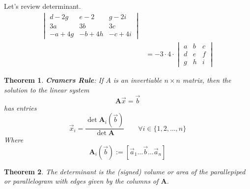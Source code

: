 \documentclass[11pt]{article}
\newtheorem{thm}{Theorem}
\begin{document}
Let's review determinant.
\begin{align*}
  \begin{vmatrix} d-2g & e-2 & g-2i \\
    3a  & 3b & 3c \\
    -a  + 4g & -b + 4h & -c + 4i \end{vmatrix} \\
  &= -3 \cdot 4 \cdot \begin{vmatrix} a & b & c \\ d & e & f \\ g & h & i \end{vmatrix}
\end{align*}
\begin{thm}
  \textbf{Cramers Rule}: If $A$ is an invertiable $n \times n$ matrix, then the solution to the linear system
  \[\mathbf{A}\vec{x} = \vec{b}\]
  has entries
  \[\vec{x}_{i} = \frac{\det \mathbf{A}_{i}(\vec{b})}{\det \mathbf{A}}\qquad \forall i \in \{1,2,\ldots , n\} \]
  Where
  \[\mathbf{A}_{i}(\vec{b}) := [\vec{a}_{1} \ldots \vec{b} \ldots \vec{a}_{n}]\]
\end{thm}

\begin{thm}
The determinant is the (signed) volume or area of the parallepiped or parallelogram with edges given by the columns of $\mathbf{A}$.
\end{thm}
\end{document}
